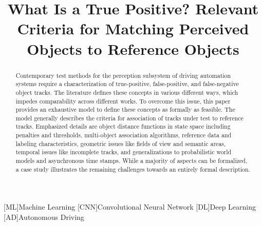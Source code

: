 \documentclass[conference]{IEEEtran}
\newcommand\nnfootnote[1]{  %
  \begin{NoHyper}
  \renewcommand\thefootnote{}\footnote{#1}%
  \addtocounter{footnote}{-1}%
  \end{NoHyper}
}
\begin{document}

\title{What Is a True Positive? Relevant Criteria for Matching Perceived Objects to Reference Objects}


\author{

}

\maketitle



\begin{acronym}
    [ML]{Machine Learning}
	[CNN]{Convolutional Neural Network}
	[DL]{Deep Learning}
	[AD]{Autonomous Driving}
\end{acronym}



\begin{abstract}
%

Contemporary test methods for the perception subsystem of driving automation systems require a characterization of true-positive, false-positive, and false-negative object tracks. %
The literature defines these concepts in various different ways, which impedes comparability across different works. 
To overcome this issue, this paper provides an exhaustive model to define these concepts as formally as feasible.
The model generally describes the criteria for association of tracks under test to reference tracks. 
Emphasized details are object distance functions in state space including penalties and thresholds, multi-object association algorithms, reference data and labeling characteristics, geometric issues like fields of view and semantic areas, temporal issues like incomplete tracks, and generalizations to probabilistic world models and asynchronous time stamps. 
While a majority of aspects can be formalized, a case study illustrates the remaining challenges towards an entirely formal description. 

\end{abstract}
\end{document}
